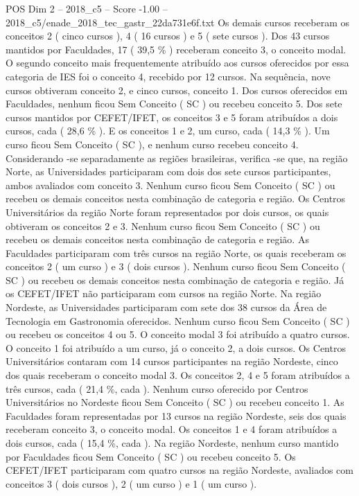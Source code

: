\begin{textsample}{POS Dim 2 – 2018\_c5 – Score -1.00 – 2018\_c5/enade\_2018\_tec\_gastr\_22da731e6f.txt}
Os demais cursos receberam os conceitos 2 ( cinco cursos ), 4 ( 16 cursos ) e 5 ( sete cursos ).
Dos 43 cursos mantidos por Faculdades, 17 ( 39,5 \% ) receberam conceito 3, o conceito modal.
O segundo conceito mais frequentemente atribuído aos cursos oferecidos por essa categoria de IES foi o conceito 4, recebido por 12 cursos.
Na sequência, nove cursos obtiveram conceito 2, e cinco cursos, conceito 1.
Dos cursos oferecidos em Faculdades, nenhum ficou Sem Conceito ( SC ) ou recebeu conceito 5.
Dos sete cursos mantidos por CEFET/IFET, os conceitos 3 e 5 foram atribuídos a dois cursos, cada ( 28,6 \% ).
E os conceitos 1 e 2, um curso, cada ( 14,3 \% ).
Um curso ficou Sem Conceito ( SC ), e nenhum curso recebeu conceito 4.
Considerando -se separadamente as regiões brasileiras, verifica -se que, na região Norte, as Universidades participaram com dois dos sete cursos participantes, ambos avaliados com conceito 3.
Nenhum curso ficou Sem Conceito ( SC ) ou recebeu os demais conceitos nesta combinação de categoria e região.
Os Centros Universitários da região Norte foram representados por dois cursos, os quais obtiveram os conceitos 2 e 3.
Nenhum curso ficou Sem Conceito ( SC ) ou recebeu os demais conceitos nesta combinação de categoria e região.
As Faculdades participaram com três cursos na região Norte, os quais receberam os conceitos 2 ( um curso ) e 3 ( dois cursos ).
Nenhum curso ficou Sem Conceito ( SC ) ou recebeu os demais conceitos nesta combinação de categoria e região.
Já os CEFET/IFET não participaram com cursos na região Norte.
Na região Nordeste, as Universidades participaram com sete dos 38 cursos da Área de Tecnologia em Gastronomia oferecidos.
Nenhum curso ficou Sem Conceito ( SC ) ou recebeu os conceitos 4 ou 5.
O conceito modal 3 foi atribuído a quatro cursos.
O conceito 1 foi atribuído a um curso, já o conceito 2, a dois cursos.
Os Centros Universitários contaram com 14 cursos participantes na região Nordeste, cinco dos quais receberam o conceito modal 3.
Os conceitos 2, 4 e 5 foram atribuídos a três cursos, cada ( 21,4 \%, cada ).
Nenhum curso oferecido por Centros Universitários no Nordeste ficou Sem Conceito ( SC ) ou recebeu conceito 1.
As Faculdades foram representadas por 13 cursos na região Nordeste, seis dos quais receberam conceito 3, o conceito modal.
Os conceitos 1 e 4 foram atribuídos a dois cursos, cada ( 15,4 \%, cada ).
Na região Nordeste, nenhum curso mantido por Faculdades ficou Sem Conceito ( SC ) ou recebeu conceito 5.
Os CEFET/IFET participaram com quatro cursos na região Nordeste, avaliados com conceitos 3 ( dois cursos ), 2 ( um curso ) e 1 ( um curso ).

\end{textsample}
